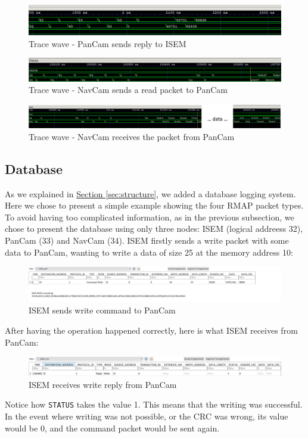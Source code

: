 \documentclass[12pt,a4paper]{article}
\begin{document}
\begin{figure}[h]
	\centering
    \includegraphics[scale = 0.7]{results/tracewave_3.png}
    \caption{Trace wave - PanCam sends reply to ISEM}
\end{figure}
\smallbreak
\begin{figure}[h]
	\centering
    \includegraphics[scale = 0.48]{results/tracewave_45.png}
    \caption{Trace wave - NavCam sends a read packet to PanCam}
\end{figure}
\smallbreak

\begin{figure}[h]
	\centering
    \includegraphics[scale = 0.55]{results/tracewave_6_et_7.png}
    \caption{Trace wave - NavCam receives the packet from PanCam}
\end{figure}
\pagebreak
\subsection{Database}

As we explained in \hyperref[sec:structure]{Section \ref*{sec:structure}}, we added a database logging system. Here we chose to present a simple example showing the four RMAP packet types. To avoid having too complicated information, as in the previous subsection, we chose to present the database using only three nodes: ISEM (logical addreess 32), PanCam (33) and NavCam (34). ISEM firstly sends a write packet with some data to PanCam, wanting to write a data of size 25 at the memory address 10:
\begin{figure}[h]
\centering
\includegraphics[scale=.4]{database_screenshots/ISEM_send}
\caption{ISEM sends write command to PanCam}
\end{figure}
\smallbreak
After having the operation happened correctly, here is what ISEM receives from PanCam:
\begin{figure}[h]
\centering
\includegraphics[scale=.4]{database_screenshots/ISEM_recv}
\caption{ISEM receives write reply from PanCam}
\end{figure}
\smallbreak
Notice how \texttt{STATUS} takes the value 1. This means that the writing was successful. In the event where writing was not possible, or the CRC was wrong, its value would be 0, and the command packet would be sent again.
\end{document}
